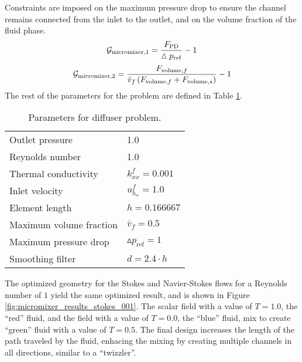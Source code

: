 Constraints are imposed on the maximum pressure drop to ensure the channel remains connected from the inlet to the outlet, and on the volume fraction of the fluid phase.
%
\begin{equation}
	\centering
	\label{eq:micromixer_constraint_1}
	\mathcal{G}_{\mathrm{micromixer,1}} = \frac{F_{\mathrm{PD}}}{\vartriangle p_{\mathrm{ref}}} - 1
\end{equation}
%
\begin{equation}
	\centering
	\label{eq:micromixer_constraint_2}
	\mathcal{G}_{\mathrm{micromixer,2}} = \frac{F_{\mathrm{volume},f}}{\bar{v}_{f}\left(F_{\mathrm{volume},f} + F_{\mathrm{volume},s} \right)} - 1
\end{equation}
%
The rest of the parameters for the problem are defined in Table \ref{tab:micromixer_parameters}.
%
\begin{table}
	\centering
	\begin{tabular*}{0.75\textwidth}{l l}
	\hline
	Outlet pressure             & 1.0 \\
	Reynolds number             & 1.0 \\
	Thermal conductivity        & $k^{f}_{xx} = 0.001$ \\
    Inlet velocity              & $u^{f}_{h_{x}} = 1.0$ \\
    Element length              & $h=0.166667$ \\
    Maximum volume fraction     & $\bar{v}_{f} = 0.5$ \\
	Maximum pressure drop       & $\vartriangle p_{\mathrm{ref}} = 1$ \\
	Smoothing filter            & $d = 2.4 \cdot h$ \\
	\hline
	\end{tabular*}
	\caption{Parameters for diffuser problem.}
	\label{tab:micromixer_parameters}
\end{table}
%
The optimized geometry for the Stokes and Navier-Stokes flows for a Reynolds number of $1$ yield the same optimized result, and is shown in Figure \ref{fig:micromixer_results_stokes_001}. The scalar field with a value of $T = 1.0$, the ``red'' fluid, and the field with a value of $T = 0.0$, the ``blue'' fluid, mix to create ``green'' fluid with a value of $T = 0.5$. The final design increases the length of the path traveled by the fluid, enhacing the mixing by creating multiple channels in all directions, similar to a ``twizzler''. 
%
